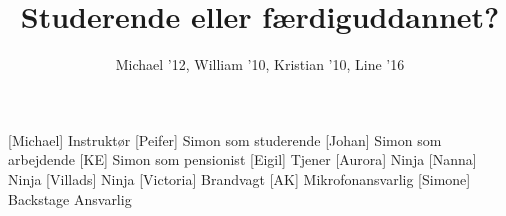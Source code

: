 \documentclass[a4paper,11pt]{article}
\title{Studerende eller færdiguddannet?}
\author{Michael '12, William '10, Kristian '10, Line '16}
\begin{document}
\maketitle

\begin{roles}
    [Michael] Instruktør
	[Peifer] Simon som studerende
	[Johan] Simon som arbejdende
	[KE] Simon som pensionist
[Eigil] Tjener
[Aurora] Ninja
[Nanna] Ninja
[Villads] Ninja
[Victoria] Brandvagt
[AK] Mikrofonansvarlig
[Simone] Backstage Ansvarlig
\end{roles}


\begin{props}
\end{props}
\end{document}
